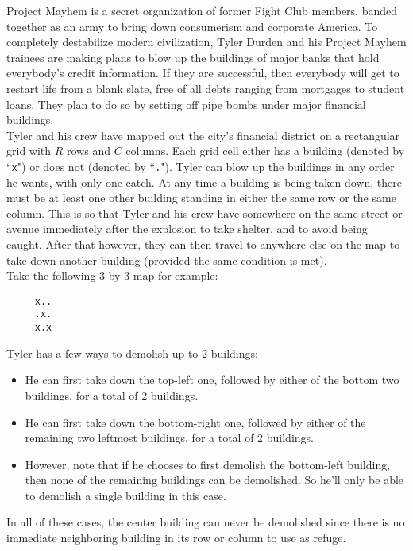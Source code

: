 
\noindent Project Mayhem is a secret organization of former Fight Club members, banded together as an army to bring down consumerism and corporate America. To completely destabilize modern civilization, Tyler Durden and his Project Mayhem trainees are making plans to blow up the buildings of major banks that hold everybody's credit information. If they are successful, then everybody will get to restart life from a blank slate, free of all debts ranging from mortgages to student loans. They plan to do so by setting off pipe bombs under major financial buildings.\\

Tyler and his crew have mapped out the city's financial district on a rectangular grid with $R$ rows and $C$ columns. Each grid cell either has a building (denoted by ``\texttt{x}") or does not (denoted by ``\texttt{.}"). Tyler can blow up the buildings in any order he wants, with only one catch. At any time a building is being taken down, there must be at least one other building standing in either the same row or the same column. This is so that Tyler and his crew have somewhere on the same street or avenue immediately after the explosion to take shelter, and to avoid being caught. After that however, they can then travel to anywhere else on the map to take down another building (provided the same condition is met).\\

\noindent Take the following 3 by 3 map for example:

\begin{verbatim}
     x..
     .x.
     x.x
\end{verbatim}

\noindent Tyler has a few ways to demolish up to 2 buildings:
\begin{itemize}
\item He can first take down the top-left one, followed by either of the bottom two buildings, for a total of 2 buildings.
\item He can first take down the bottom-right one, followed by either of the remaining two leftmost buildings, for a total of 2 buildings.
\item However, note that if he chooses to first demolish the bottom-left building, then none of the remaining buildings can be demolished. So he'll only be able to demolish a single building in this case.
\end{itemize}
In all of these cases, the center building can never be demolished since there is no immediate neighboring building in its row or column to use as refuge.\\

